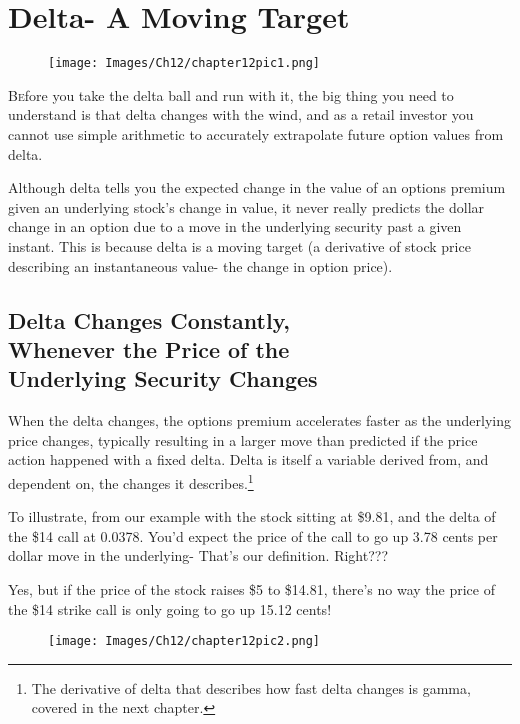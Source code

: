 

\chapter{Delta- A Moving Target}\label{ch:Delta- A Moving Target}

\begin{figure}[H]
  \centering
    \texttt{[image: Images/Ch12/chapter12pic1.png]}
\end{figure}

\lettrine{B}{e}fore you take the delta ball and run with it, the big thing you need to understand is that delta changes with the wind, and as a retail investor you cannot use simple arithmetic to accurately extrapolate future option values from delta.

Although delta tells you the expected change in the value of an options premium given an underlying stock’s change in value, it never really predicts the dollar change in an option due to a move in the underlying security past a given instant. This is because delta is a moving target (a derivative of stock price describing an instantaneous value- the change in option price). 

\section{Delta Changes Constantly,\\ Whenever the Price of the\\ Underlying Security Changes}

When the delta changes, the options premium accelerates faster as the underlying price changes, typically resulting in a larger move than predicted if the price action happened with a fixed delta. Delta is itself a variable derived from, and dependent on, the changes it describes.\footnote{The derivative of delta that describes how fast delta changes is gamma, covered in the next chapter.}  

To illustrate, from our example with the stock sitting at \$9.81, and the delta of the \$14 call at 0.0378. You’d expect the price of the call to go up 3.78 cents per dollar move in the underlying- That’s our definition. Right??? 

Yes, but if the price of the stock raises \$5 to \$14.81, there’s no way the price of the \$14 strike call is only going to go up 15.12 cents! 

\begin{figure}[H]
  \centering
    \texttt{[image: Images/Ch12/chapter12pic2.png]}
\end{figure}

